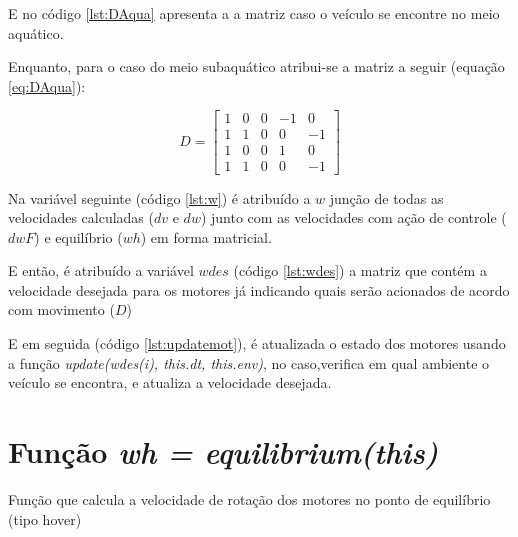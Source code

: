 E no código \ref{lst:DAqua} apresenta a a matriz caso o veículo se encontre no meio aquático.



Enquanto, para o caso do meio subaquático atribui-se a matriz a seguir (equação \ref{eq:DAqua}):

\begin{equation}
    D =
    \begin{bmatrix}
        1 & 0 & 0 & -1 & 0 \\
        1 & 1 & 0 & 0 & -1 \\
        1 & 0 & 0 & 1 & 0 \\
        1 & 1 & 0 & 0 & -1 
    \end{bmatrix}
    \label{eq:DAqua}
\end{equation}

Na variável seguinte (código \ref{lst:w}) é atribuído a $w$ junção de todas as velocidades calculadas ($dv$ e $dw$) junto com as velocidades com ação de controle ($dwF$) e equilíbrio ($wh$) em forma matricial.


E então, é atribuído a variável $wdes$ (código \ref{lst:wdes}) a matriz que contém a velocidade desejada para os motores já indicando quais serão acionados de acordo com movimento ($D$)


E em seguida (código \ref{lst:updatemot}), é atualizada o estado dos motores usando a função \textit{update(wdes(i), this.dt, this.env)}, no caso,verifica em qual ambiente o veículo se encontra, e atualiza a velocidade desejada.



\section{Função \textit{wh = equilibrium(this)}}
\label{sec:equil}
Função que calcula a velocidade de rotação dos motores no ponto de equilíbrio (tipo hover)

